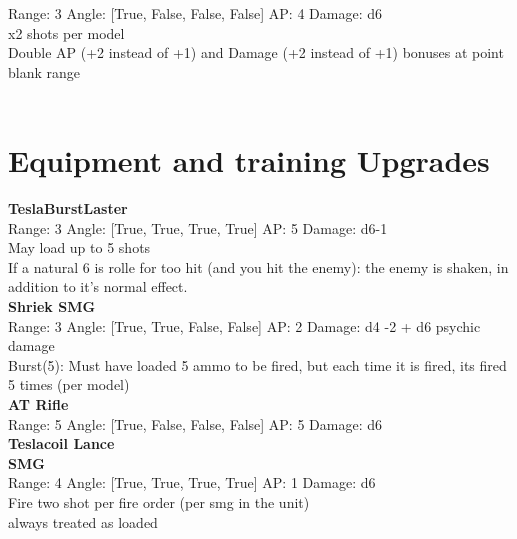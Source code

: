 Range: 3  Angle: [True, False, False, False] AP: 4 Damage: d6 \\
x2 shots per model\\ 
Double AP (+2 instead of +1) and Damage (+2 instead of +1) bonuses at point blank range\\ 




 
\ \\


\section{Equipment and training Upgrades}{\bf TeslaBurstLaster } \\



Range: 3  Angle: [True, True, True, True] AP: 5 Damage: d6-1 \\
May load up to 5 shots\\ 
If a natural 6 is rolle for too hit (and you hit the enemy): the enemy is shaken, in addition to it's normal effect.\\ 




{\bf Shriek SMG } \\



Range: 3  Angle: [True, True, False, False] AP: 2 Damage: d4 -2 + d6 psychic damage \\
Burst(5): Must have loaded 5 ammo to be fired, but each time it is fired, its fired 5 times (per model)\\ 




{\bf AT Rifle } \\



Range: 5  Angle: [True, False, False, False] AP: 5 Damage: d6 \\




{\bf Teslacoil Lance } \\






{\bf SMG } \\



Range: 4  Angle: [True, True, True, True] AP: 1 Damage: d6 \\
Fire two shot per fire order (per smg in the unit)\\ 
always treated as loaded\\ 




